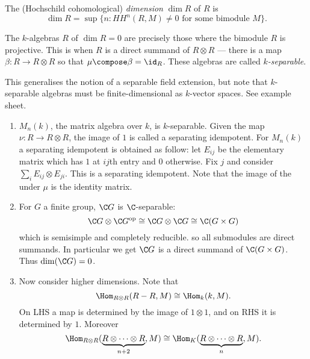 \documentclass[a4paper]{article}
\begin{document}
\begin{definition}
  The (Hochschild cohomological) \emph{dimension} \(\dim R\) of \(R\) is
  \[
    \dim R = \sup \{n: HH^n(R, M) \neq 0 \text{ for some bimodule } M\}.
  \]
\end{definition}

\begin{definition}[separable]
  The \(k\)-algebras \(R\) of \(\dim R = 0\) are precisely  those where the bimodule \(R\) is projective. This is when \(R\) is a direct summand of \(R \otimes R\) --- there is a map \(\beta: R \to R \otimes R\) so that \(\mu \compose \beta = \id_R\). These algebras are called \emph{\(k\)-separable}.
\end{definition}

This generalises the notion of a separable field extension, but note that \(k\)-separable algebras must be finite-dimensional as \(k\)-vector spaces. See example sheet.

\begin{eg}\leavevmode
  \begin{enumerate}
  \item \(M_n(k)\), the matrix algebra over \(k\), is \(k\)-separable. Given the map \(\nu: R \to R \otimes R\), the image of \(1\) is called a separating idempotent. For \(M_n(k)\) a separating idempotent is obtained as follow: let \(E_{ij}\) be the elementary matrix which has \(1\) at \(ij\)th entry and \(0\) otherwise. Fix \(j\) and consider \(\sum_i E_{ij} \otimes E_{ji}\). This is a separating idempotent. Note that the image of the under \(\mu\) is the identity matrix.
  \item For \(G\) a finite group, \(\C G\) is \(\C\)-separable:
    \[
      \C G \otimes \C G^{\text{op}}
      \cong \C G \otimes \C G
      \cong \C( G \times G)
    \]
    which is semisimple and completely reducible. so all submodules are direct summands. In particular we get \(\C G\) is a direct summand of \(\C(G \times G)\). Thus \(\dim (\C G) = 0\).
  \item Now consider higher dimensions. Note that
    \[
      \Hom_{R \otimes R} (R - R, M) \cong \Hom_k (k, M).
    \]
    On LHS a map is determined by the image of \(1 \otimes 1\), and on RHS it is determined by \(1\). Moreover
    \[
      \Hom_{R \otimes R} (\underbrace{R \otimes \dots \otimes R}_{n + 2}, M) \cong \Hom_K  (\underbrace{R \otimes \dots \otimes R}_n, M).
    \]
  \end{enumerate}
\end{eg}
\end{document}
